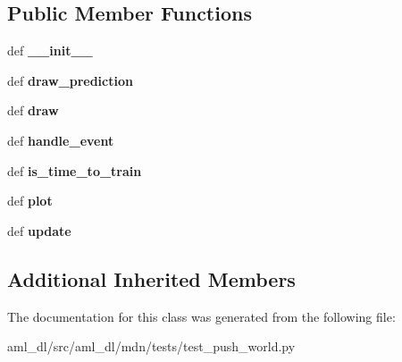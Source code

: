 \subsection*{Public Member Functions}
\begin{DoxyCompactItemize}
\item 
\hypertarget{classtest__push__world_1_1_test_model_push_world_a3d786a8d1b6128d927ceef1e1fe85113}{def {\bfseries \-\_\-\-\_\-init\-\_\-\-\_\-}}\label{classtest__push__world_1_1_test_model_push_world_a3d786a8d1b6128d927ceef1e1fe85113}

\item 
\hypertarget{classtest__push__world_1_1_test_model_push_world_a2fec12ddbaab6f9125db0295672bcffc}{def {\bfseries draw\-\_\-prediction}}\label{classtest__push__world_1_1_test_model_push_world_a2fec12ddbaab6f9125db0295672bcffc}

\item 
\hypertarget{classtest__push__world_1_1_test_model_push_world_a3e69081b4a8a3a3521968f1b546d05df}{def {\bfseries draw}}\label{classtest__push__world_1_1_test_model_push_world_a3e69081b4a8a3a3521968f1b546d05df}

\item 
\hypertarget{classtest__push__world_1_1_test_model_push_world_a91917b0d4f5973cbb75d2731832d8bb0}{def {\bfseries handle\-\_\-event}}\label{classtest__push__world_1_1_test_model_push_world_a91917b0d4f5973cbb75d2731832d8bb0}

\item 
\hypertarget{classtest__push__world_1_1_test_model_push_world_ad767bc2b19a1207899d85b3ed7b5ba39}{def {\bfseries is\-\_\-time\-\_\-to\-\_\-train}}\label{classtest__push__world_1_1_test_model_push_world_ad767bc2b19a1207899d85b3ed7b5ba39}

\item 
\hypertarget{classtest__push__world_1_1_test_model_push_world_af889b88cceb525d5af180d99edf13043}{def {\bfseries plot}}\label{classtest__push__world_1_1_test_model_push_world_af889b88cceb525d5af180d99edf13043}

\item 
\hypertarget{classtest__push__world_1_1_test_model_push_world_a774505b42890fec3f868eab603294503}{def {\bfseries update}}\label{classtest__push__world_1_1_test_model_push_world_a774505b42890fec3f868eab603294503}

\end{DoxyCompactItemize}
\subsection*{Additional Inherited Members}


The documentation for this class was generated from the following file\-:\begin{DoxyCompactItemize}
\item 
aml\-\_\-dl/src/aml\-\_\-dl/mdn/tests/test\-\_\-push\-\_\-world.\-py\end{DoxyCompactItemize}
